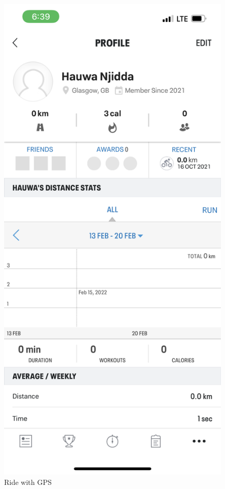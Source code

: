 \documentclass{l4proj}
\begin{document}
\begin{figure}
\begin{minipage}[b]{0.3\textwidth}
  \caption{Ride with GPS}
 \end{minipage}%
 \begin{minipage}[b]{0.3\textwidth}
  \includegraphics[width=1\textwidth]{images/MYPA.PNG}

\end{minipage}
\end{figure}
\end{document}
